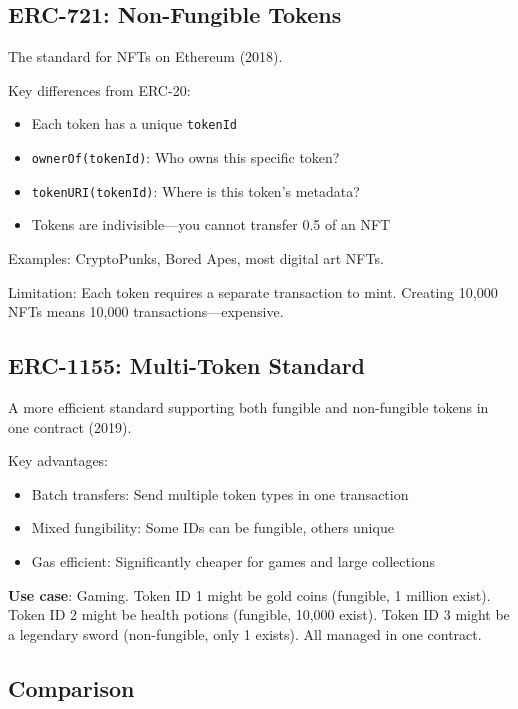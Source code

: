 \documentclass[11pt,a4paper]{article}
\begin{document}
\subsection{ERC-721: Non-Fungible Tokens}

The standard for NFTs on Ethereum (2018).

Key differences from ERC-20:
\begin{itemize}
    \item Each token has a unique \texttt{tokenId}
    \item \texttt{ownerOf(tokenId)}: Who owns this specific token?
    \item \texttt{tokenURI(tokenId)}: Where is this token's metadata?
    \item Tokens are indivisible---you cannot transfer 0.5 of an NFT
\end{itemize}

Examples: CryptoPunks, Bored Apes, most digital art NFTs.

Limitation: Each token requires a separate transaction to mint. Creating 10,000 NFTs means 10,000 transactions---expensive.

\subsection{ERC-1155: Multi-Token Standard}

A more efficient standard supporting both fungible and non-fungible tokens in one contract (2019).

Key advantages:
\begin{itemize}
    \item Batch transfers: Send multiple token types in one transaction
    \item Mixed fungibility: Some IDs can be fungible, others unique
    \item Gas efficient: Significantly cheaper for games and large collections
\end{itemize}

\textbf{Use case}: Gaming. Token ID 1 might be gold coins (fungible, 1 million exist). Token ID 2 might be health potions (fungible, 10,000 exist). Token ID 3 might be a legendary sword (non-fungible, only 1 exists). All managed in one contract.

\subsection{Comparison}
\end{document}
